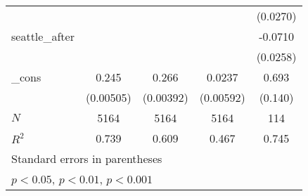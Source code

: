 {\begin{tabular}{l*{4}{c}}
            &                     &                     &                     &    (0.0270)         \\
[1em]
seattle\_after&                     &                     &                     &     -0.0710\sym{**} \\
            &                     &                     &                     &    (0.0258)         \\
[1em]
\_cons      &       0.245\sym{***}&       0.266\sym{***}&      0.0237\sym{***}&       0.693\sym{***}\\
            &   (0.00505)         &   (0.00392)         &   (0.00592)         &     (0.140)         \\
\hline
\(N\)       &        5164         &        5164         &        5164         &         114         \\
\(R^{2}\)   &       0.739         &       0.609         &       0.467         &       0.745         \\
\hline\hline
\multicolumn{5}{l}{\footnotesize Standard errors in parentheses}\\
\multicolumn{5}{l}{\footnotesize \sym{*} \(p<0.05\), \sym{**} \(p<0.01\), \sym{***} \(p<0.001\)}\\
\end{tabular}
}
